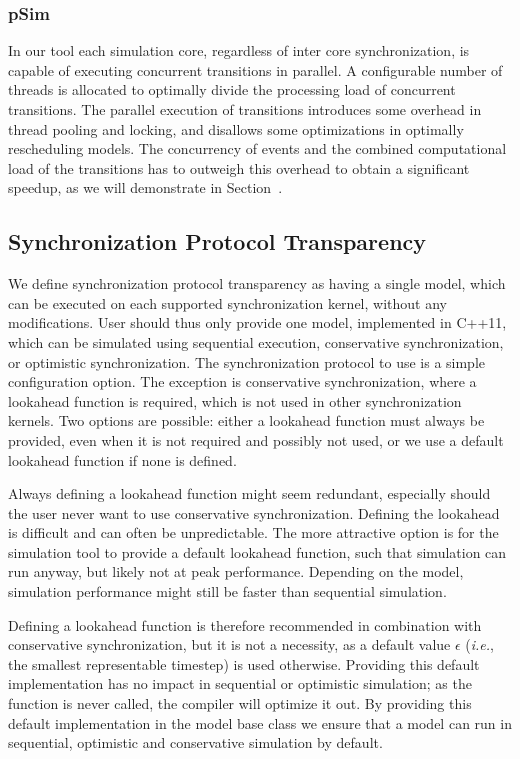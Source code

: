 \subsubsection{pSim}
In our tool each simulation core, regardless of inter core synchronization, is capable of executing concurrent transitions in parallel. A configurable number of threads is allocated to optimally divide the processing load of concurrent transitions. The parallel execution of transitions introduces some overhead in thread pooling and locking, and disallows some optimizations in optimally rescheduling models. The concurrency of events and the combined computational load of the transitions has to outweigh this overhead to obtain a significant speedup, as we will demonstrate in Section~\textsc{}.

\subsection{Synchronization Protocol Transparency}
We define synchronization protocol transparency as having a single model, which can be executed on each supported synchronization kernel, without any modifications.
User should thus only provide one model, implemented in C++11, which can be simulated using sequential execution, conservative synchronization, or optimistic synchronization.
The synchronization protocol to use is a simple configuration option.
The exception is conservative synchronization, where a lookahead function is required, which is not used in other synchronization kernels.
Two options are possible: either a lookahead function must always be provided, even when it is not required and possibly not used, or we use a default lookahead function if none is defined.

Always defining a lookahead function might seem redundant, especially should the user never want to use conservative synchronization.
Defining the lookahead is difficult and can often be unpredictable.
The more attractive option is for the simulation tool to provide a default lookahead function, such that simulation can run anyway, but likely not at peak performance.
Depending on the model, simulation performance might still be faster than sequential simulation. 

Defining a lookahead function is therefore recommended in combination with conservative synchronization, but it is not a necessity, as a default value $\epsilon$ (\textit{i.e.}, the smallest representable timestep) is used otherwise.
Providing this default implementation has no impact in sequential or optimistic simulation; as the function is never called, the compiler will optimize it out.
By providing this default implementation in the model base class we ensure that a model can run in sequential, optimistic and conservative simulation by default.

